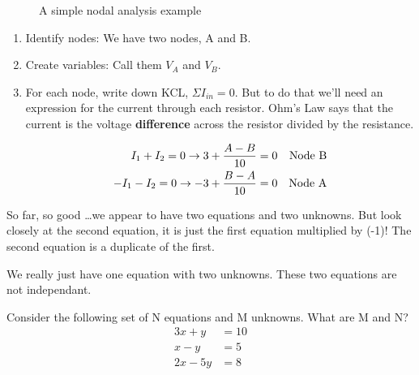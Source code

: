 \begin{figure}[H]
\begin{center}
\caption{A simple nodal analysis example}
\end{center}
\end{figure}

\begin{enumerate}
\item Identify nodes: We have two nodes, A and B.
\item Create variables: Call them $V_A$ and $V_B$.
\item For each node, write down KCL, $\Sigma I_{in}=0$. But to do that we'll need an expression for the current through each resistor. Ohm's Law says that the current is the voltage \textbf{difference} across the resistor divided by the resistance. 
\par
\begin{align}
I_1+I_2=0 \rightarrow 3 + \frac{A-B}{10}=0&&\text{Node B} \label{E:4N}\\
-I_1-I_2=0 \rightarrow -3 + \frac{B-A}{10}=0&&\text{Node A} \notag 
\end{align} 
\end{enumerate}

So far, so good \dots we appear to have two equations and two unknowns. But look closely at the second equation, it is just the first equation multiplied by (-1)! The second equation is a duplicate of the first.\par

We really just have one equation with two unknowns. These two equations are not independant.\par

\begin{alevel}
Consider the following set of N equations and M unknowns. What are M and N?
\begin{align*}
3x+y&=10\\
x-y&=5\\
2x-5y&=8
\end{align*} 
\end{alevel}

